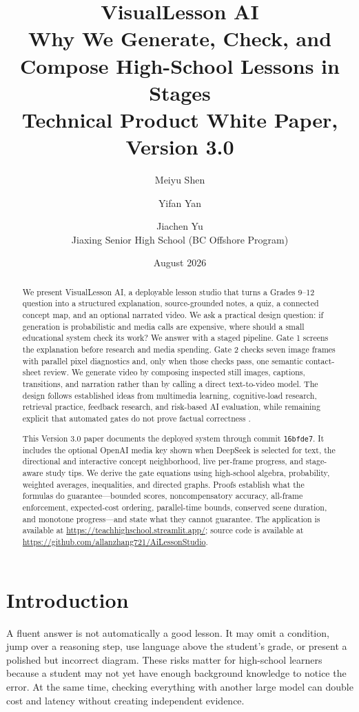 \documentclass[11pt]{article}
\title{\textbf{VisualLesson AI}\\[0.35em]\large Why We Generate, Check, and Compose High-School Lessons in Stages\\[0.75em]\normalsize Technical Product White Paper, Version 3.0}
\author{Meiyu Shen \and Yifan Yan \and Jiachen Yu\\Jiaxing Senior High School (BC Offshore Program)}
\date{August 2026}
\newcommand{\product}{VisualLesson AI}
\newcommand{\code}[1]{\texttt{#1}}
\theoremstyle{plain}
\theoremstyle{definition}
\begin{document}
\maketitle

\begin{abstract}
We present \product, a deployable lesson studio that turns a Grades 9--12 question into a structured explanation, source-grounded notes, a quiz, a connected concept map, and an optional narrated video. We ask a practical design question: if generation is probabilistic and media calls are expensive, where should a small educational system check its work? We answer with a staged pipeline. Gate 1 screens the explanation before research and media spending. Gate 2 checks seven image frames with parallel pixel diagnostics and, only when those checks pass, one semantic contact-sheet review. We generate video by composing inspected still images, captions, transitions, and narration rather than by calling a direct text-to-video model. The design follows established ideas from multimedia learning, cognitive-load research, retrieval practice, feedback research, and risk-based AI evaluation, while remaining explicit that automated gates do not prove factual correctness \citep{mayer2009multimedia,sweller1988,roediger2006,hattie2007,nist2024airmf}.

This Version 3.0 paper documents the deployed system through commit \code{16bfde7}. It includes the optional OpenAI media key shown when DeepSeek is selected for text, the directional and interactive concept neighborhood, live per-frame progress, and stage-aware study tips. We derive the gate equations using high-school algebra, probability, weighted averages, inequalities, and directed graphs. Proofs establish what the formulas do guarantee---bounded scores, noncompensatory accuracy, all-frame enforcement, expected-cost ordering, parallel-time bounds, conserved scene duration, and monotone progress---and state what they cannot guarantee. The application is available at \url{https://teachhighschool.streamlit.app/}; source code is available at \url{https://github.com/allanzhang721/AiLessonStudio}.
\end{abstract}

\section{Introduction}

A fluent answer is not automatically a good lesson. It may omit a condition, jump over a reasoning step, use language above the student's grade, or present a polished but incorrect diagram. These risks matter for high-school learners because a student may not yet have enough background knowledge to notice the error. At the same time, checking everything with another large model can double cost and latency without creating independent evidence.
\end{document}
